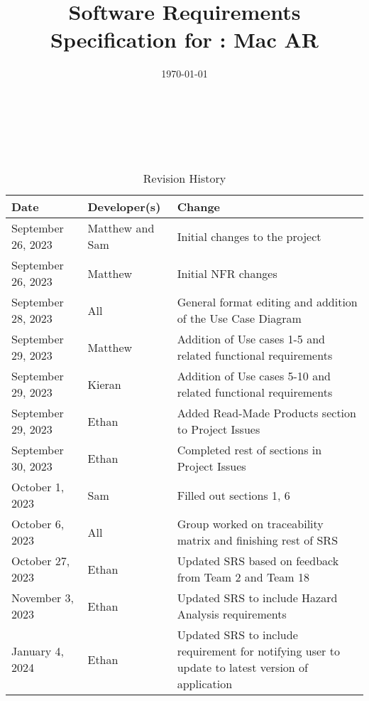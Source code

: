 \documentclass[12pt]{article}
\begin{document}
\title{Software Requirements Specification for \progname: Mac AR}
\author{\authname}
\date{\today}

\maketitle

~\newpage


\tableofcontents

~\newpage

\begin{table}[hp]
	\caption{Revision History} \label{TblRevisionHistory}
	\begin{tabularx}{\textwidth}{llX}
		\toprule
		\textbf{Date}      & \textbf{Developer(s)} & \textbf{Change}                                                                    \\
		\midrule
		September 26, 2023 & Matthew and Sam               & Initial changes to the project                                                             \\
            September 26, 2023 & Matthew & Initial NFR changes \\
            September 28, 2023 & All & General format editing and addition of the Use Case Diagram\\
            September 29, 2023 & Matthew & Addition of Use cases 1-5 and related functional requirements\\
            September 29, 2023 & Kieran & Addition of Use cases 5-10 and related functional requirements\\
            September 29, 2023 & Ethan & Added Read-Made Products section to Project Issues\\
            September 30, 2023 & Ethan & Completed rest of sections in Project Issues\\
            October 1, 2023 & Sam & Filled out sections 1, 6\\
            October 6, 2023 & All & Group worked on traceability matrix and finishing rest of SRS\\  
            October 27, 2023 & Ethan & Updated SRS based on feedback from Team 2 and Team 18\\
            November 3, 2023 & Ethan & Updated SRS to include Hazard Analysis requirements\\
            January 4, 2024 & Ethan & Updated SRS to include requirement for notifying user to update to latest version of application\\
		\bottomrule
	\end{tabularx}
\end{table}
\end{document}
